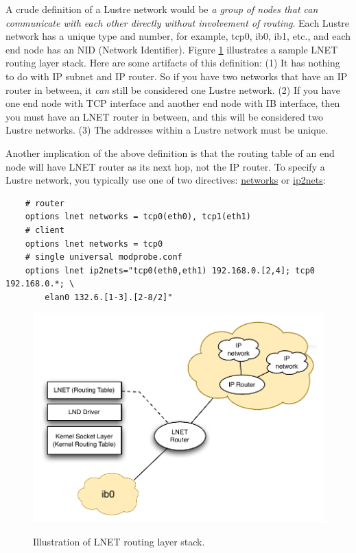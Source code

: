 A crude definition of a Lustre network would be \textit{a group of nodes that
can communicate with each other directly without involvement of routing}. Each
Lustre network has a unique type and number, for example, tcp0, ib0, ib1, etc.,
and each end node has an NID (Network Identifier). Figure
\ref{fig:lnet_topology} illustrates a sample LNET routing layer stack. Here are
some artifacts of this definition: (1) It has nothing to do with IP subnet and
IP router. So if you have two networks that have an IP router in between, it
\textit{can} still be considered one Lustre network. (2) If you have one end
node with TCP interface and another end node with IB interface, then you must
have an LNET router in between, and this will be considered two Lustre
networks. (3) The addresses within a Lustre network must be unique.  

Another implication of the above definition is that the routing table of an end node
will have LNET router as its next hop, not the IP router. To specify a Lustre
network, you typically use one of two directives: \url{networks} or \url{ip2nets}: 

\begin{Verbatim}
    # router
    options lnet networks = tcp0(eth0), tcp1(eth1)
    # client
    options lnet networks = tcp0
    # single universal modprobe.conf
    options lnet ip2nets="tcp0(eth0,eth1) 192.168.0.[2,4]; tcp0 192.168.0.*; \
        elan0 132.6.[1-3].[2-8/2]"
\end{Verbatim}


\begin{figure}[htb]
\centering
\includegraphics[width=4.5in]{img/lnet_topology}
\label{fig:lnet_topology}
\caption{Illustration of LNET routing layer stack.}
\end{figure}


